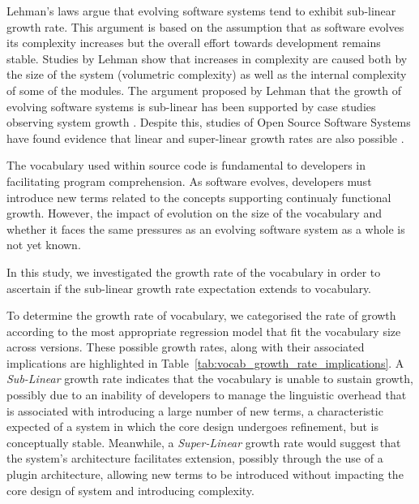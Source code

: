 Lehman's laws argue that evolving software systems tend to exhibit sub-linear growth rate. This argument is based on the assumption that as software evolves its complexity increases but the overall effort towards development remains stable. Studies by Lehman \cite{Lehman97a} show that increases in complexity are caused both by the size of the system (volumetric complexity) as well as the internal complexity of some of the modules. The argument proposed by Lehman that the growth of evolving software systems is sub-linear has been supported by case studies observing system growth \cite{DAmbros07a, Gall97a, Lehman97a}. Despite this, studies of Open Source Software Systems have found evidence that linear and super-linear growth rates are also possible \cite{Godfrey01a,Israeli09a,Succi01a}.

The vocabulary used within source code is fundamental to developers in facilitating program comprehension. As software evolves, developers must introduce new terms related to the concepts supporting continualy functional growth. However, the impact of evolution on the size of the vocabulary and whether it faces the same pressures as an evolving software system as a whole is not yet known.

In this study, we investigated the growth rate of the vocabulary in order to ascertain if the sub-linear growth rate expectation extends to vocabulary.

To determine the growth rate of vocabulary, we categorised the rate of growth according to the most appropriate regression model that fit the vocabulary size across versions. These possible growth rates, along with their associated implications are highlighted in Table~\ref{tab:vocab_growth_rate_implications}. A \emph{Sub-Linear} growth rate indicates that the vocabulary is unable to sustain growth, possibly due to an inability of developers to manage the linguistic overhead that is associated with introducing a large number of new terms, a characteristic expected of a system in which the core design undergoes refinement, but is conceptually stable. Meanwhile, a \emph{Super-Linear} growth rate would suggest that the system's architecture facilitates extension, possibly through the use of a plugin architecture, allowing new terms to be introduced without impacting the core design of system and introducing complexity.

